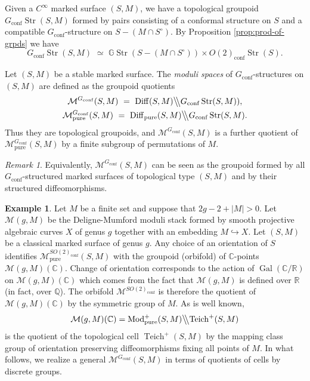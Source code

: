 \documentclass[english,11pt,leqno]{article}
\def\CC{\mathbb{C}}
\def\GG{\mathbb{G}}
\def\RR{\mathbb{R}}
\def\QQ{\mathbb{Q}}
\def\Mc{\mathcal{M}}
\def\conf{{\on{conf}}}
\def\Mod{\operatorname{Mod}}
\def\on{\operatorname}
\def\pure{{\on{pure}}}
\def\Bbs {{\bigl\backslash \hskip -.1cm \bigl\backslash}}
\def\be{\begin{equation}}
\def\ee{\end{equation}}
\def\Bbs {\bigl\backslash \hskip -.1cm \bigl\backslash}
\def\Gcstr{G_\conf\on{Str}}
\def\Teich{\on{Teich}}
\def\Diff{\on{Diff}}
\theoremstyle{definition}
\newtheorem{exa}[thm]{Example}
\theoremstyle{remark}
\newtheorem{rem}[thm]{Remark}
\numberwithin{equation}{section}
\begin{document}
 Given a $C^\infty$ marked surface $(S,M)$, we have a  topological groupoid   $G_\conf\on{Str}(S,M)$
 formed by pairs consisting of a conformal structure on $S$ and a compatible $G_\conf$-structure on
 $S-(M\cap S^\circ)$. By Proposition \ref {prop:prod-of-grpds} we have
 \be\label{eq:prod-str}
 G_\conf\on{Str}(S,M)\,\,\simeq \,\, \GG\on{Str}(S-(M\cap S^\circ))\times O(2)_\conf\on{Str}(S). 
 \ee
 
 

Let $(S, M)$ be a stable marked surface. The {\em moduli spaces} of $G_\conf$-structures on
$(S,M)$ are defined as the groupoid quotients
 \be
\begin{gathered}
\Mc^{G_\conf}(S,M) \,\,=\,\, \Diff(S,M) \Bbs \Gcstr(S,M)),  \\
\Mc^{G_\conf}_\pure (S,M) \,\,=\,\, \Diff_\pure(S,M) \Bbs \Gcstr(S,M). 
\end{gathered}
\ee
Thus they are topological groupoids, and $\Mc^{G_\conf}(S,M)$ is a further quotient of
$\Mc^{G_\conf}_\pure(S,M)$ by a finite subgroup of permutations of $M$.

\begin{rem}
Equivalently, $\Mc^{G_\conf}(S,M)$ can be seen as the groupoid formed by all $G_\conf$-structured marked
surfaces of topological type $(S,M)$ and by their structured diffeomorphisms. 
\end{rem}

\begin{exa}
Let $M$ be a finite set and suppose that $2g-2+|M|>0$. Let $\Mc(g,M)$ be the Deligne-Mumford moduli stack
formed by smooth projective algebraic curves $X$ of genus $g$ together with an embedding $M\hookrightarrow X$. 
Let $(S,M)$ be a classical marked surface of genus $g$. Any choice of an orientation of $S$ identifies
$\Mc^{SO(2)_\conf}_{\pure}(S,M)$ with the groupoid (orbifold) of $\CC$-points $\Mc(g,M)(\CC)$. Change of orientation corresponds to the
action of $\on{Gal}(\CC/\RR)$ on $\Mc(g,M)(\CC)$ which comes from the fact that $\Mc(g,M)$ is defined
over $\RR$ (in fact, over $\QQ$). The  orbifold $\Mc^{SO(2)_\conf}$ is therefore the quotient of $\Mc(g,M)(\CC)$
by the symmetric group of $M$. As is well known,
\[
\Mc(g,M)(\CC) = \Mod^+_\pure(S,M) \Bbs \Teich^+(S,M)
\]
is the quotient of the topological cell $\Teich^+(S,M)$ by the mapping class group
of orientation preserving diffeomorphisms fixing all points of $M$. In what follows, we realize a general
$\Mc^{G_\conf}(S,M)$ in terms of quotients of cells by discrete groups.
\end{exa}
\end{document}
